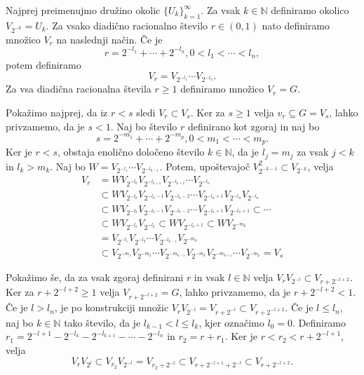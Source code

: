 \documentclass[mat1]{fmfdelo}
\newcommand{\N}{\mathbb N}
\begin{document}
\begin{dokaz}
Najprej preimenujmo družino okolic $\lbrace U_k \rbrace_{k = 1}^\infty$. Za vsak $k \in \N$ definiramo okolico $V_{2^{-k}} = U_k$. Za vsako diadično racionalno število $r \in (0, 1)$ nato definiramo množico $V_r$ na naslednji način. Če je
\[ r = 2^{-l_1} + \cdots + 2^{-l_n}, 0 < l_1 < \cdots < l_n, \]
potem definiramo
\[ V_r = V_{2^{-l_1}}\cdots V_{2^{-l_n}}. \]
Za vsa diadična racionalna števila $r \geq 1$ definiramo množico $V_r = G$.

Pokažimo najprej, da iz $r < s$ sledi $V_r \subset V_s$. Ker za $s \geq 1$ velja $v_r \subseteq G = V_s$, lahko privzamemo, da je $s < 1$.
Naj bo število $r$ definirano kot zgoraj in naj bo
\[ s = 2^{-m_1} + \cdots + 2^{-m_p}, 0 < m_1 < \cdots < m_p. \]
Ker je $r < s$, obstaja enolično določeno število $k \in \N$, da je $l_j = m_j$ za vsak $j < k$ in $l_k > m_k$. Naj bo $W = V_{2^{-l_1}}\cdots V_{2^{-l_{k-1}}}$.
Potem, upoštevajoč $V_{2^{-k-1}}^2 \subset V_{2^{-k}}$, velja
\begin{align*}
V_r &= WV_{2^{-l_k}}V_{2^{-l_{k+1}}}V_{2^{-l_{k+2}}}\cdots V_{2^{-l_n}} \\
&\subset WV_{2^{-l_k}}V_{2^{-l_k-1}}V_{2^{-l_k-2}}\cdots V_{2^{-l_n+1}}V_{2^{-l_n}}V_{2^{-l_n}} \\
&\subset WV_{2^{-l_k}}V_{2^{-l_k-1}}V_{2^{-l_k-2}}\cdots V_{2^{-l_n+1}}V_{2^{-l_n+1}} \subset \cdots \\
&\subset WV_{2^{-l_k}}V_{2^{-l_k}} \subset WV_{2^{-l_k+1}} \subset WV_{2^{-m_k}} \\
&= V_{2^{-l_1}}V_{2^{-l_2}}\cdots V_{2^{-l_{k-1}}}V_{2^{-m_k}} \\
&\subset V_{2^{-m_1}}V_{2^{-m_2}}\cdots V_{2^{-m_{k-1}}}V_{2^{-m_k}}V_{2^{-m_{k+1}}}\cdots V_{2^{-m_p}} = V_s
\end{align*}

Pokažimo še, da za vsak zgoraj definirani $r$ in vsak $l \in \N$ velja $V_rV_{2^{-l}} \subset V_{r + 2^{-l+2}}$. Ker za $r + 2^{-l+2} \geq 1$ velja $V_{r + 2^{-l+2}} = G$, lahko privzamemo, da je  $r + 2^{-l+2} < 1$.
Če je $l > l_n$, je po konstrukciji množic $V_rV_{2^{-l}} = V_{r + 2^{-l}} \subset V_{r + 2^{-l+2}}$. Če je $l \leq l_n$, naj bo $k \in \N$ tako število, da je $l_{k-1} < l \leq l_k$, kjer označimo $l_0 = 0$. Definiramo $r_1 = 2^{-l+1} - 2^{-l_k} - 2^{-l_{k+1}} - \cdots - 2^{-l_n}$ in $r_2 = r + r_1$. Ker je $r < r_2 < r + 2^{-l+1}$, velja
\[ V_rV_{2^{l}} \subset V_{r_2}V_{2^{-l}} = V_{r_2 + 2^{-l}} \subset V_{r + 2^{-l+1} + 2^{-l}} \subset V_{r + 2^{-l+2}}. \]


\end{dokaz}
\end{document}
